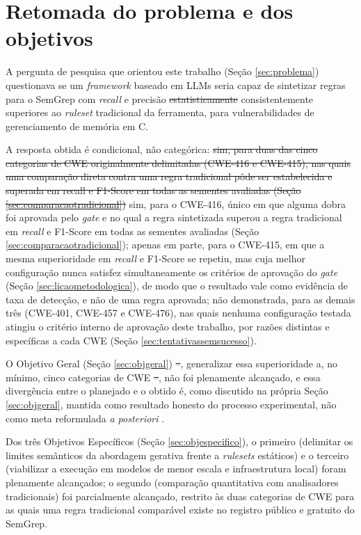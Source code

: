 \documentclass[
    12pt,                %
    openright,           %
    oneside,             %
    a4paper,             %
    english,             %
    brazil               %
]{abntex2}
\newcommand{\antigo}[1]{\sout{#1}}
\newcommand{\novo}[1]{{\color{red}#1}}
\begin{document}
\section{Retomada do problema e dos objetivos}
\par
A pergunta de pesquisa que orientou este trabalho (Seção \ref{sec:problema}) questionava se um \textit{framework} baseado em LLMs seria capaz de sintetizar regras para o SemGrep com \textit{recall} e precisão \antigo{estatisticamente} \novo{consistentemente} superiores ao \textit{ruleset} tradicional da ferramenta, para vulnerabilidades de gerenciamento de memória em C.
\par
A resposta obtida é condicional, não categórica: \antigo{sim, para duas das cinco categorias de CWE originalmente delimitadas (CWE-416 e CWE-415), nas quais uma comparação direta contra uma regra tradicional pôde ser estabelecida e superada em recall e F1-Score em todas as sementes avaliadas (Seção \ref{sec:comparacaotradicional})} \novo{sim, para o CWE-416, único em que alguma dobra foi aprovada pelo \textit{gate} e no qual a regra sintetizada superou a regra tradicional em \textit{recall} e F1-Score em todas as sementes avaliadas (Seção \ref{sec:comparacaotradicional}); apenas em parte, para o CWE-415, em que a mesma superioridade em \textit{recall} e F1-Score se repetiu, mas cuja melhor configuração nunca satisfez simultaneamente os critérios de aprovação do \textit{gate} (Seção \ref{sec:licaometodologica}), de modo que o resultado vale como evidência de taxa de detecção, e não de uma regra aprovada}; não demonstrada, para as demais três (CWE-401, CWE-457 e CWE-476), nas quais nenhuma configuração testada atingiu o critério interno de aprovação deste trabalho, por razões distintas e específicas a cada CWE (Seção \ref{sec:tentativassemsucesso}).
\par
O Objetivo Geral (Seção \ref{sec:objgeral})\antigo{ --}\novo{,} generalizar essa superioridade a, no mínimo, cinco categorias de CWE\antigo{ --}\novo{,} não foi plenamente alcançado, e essa divergência entre o planejado e o obtido é, como discutido na própria Seção \ref{sec:objgeral}, mantida como resultado honesto do processo experimental, não como meta reformulada \textit{a posteriori} \cite{Wazlawick2020}.
\par
Dos três Objetivos Específicos (Seção \ref{sec:objespecifico}), o primeiro (delimitar os limites semânticos da abordagem gerativa frente a \textit{rulesets} estáticos) e o terceiro (viabilizar a execução em modelos de menor escala e infraestrutura local) foram plenamente alcançados; o segundo (comparação quantitativa com analisadores tradicionais) foi parcialmente alcançado, restrito às duas categorias de CWE para as quais uma regra tradicional comparável existe no registro público e gratuito do SemGrep.
\end{document}
